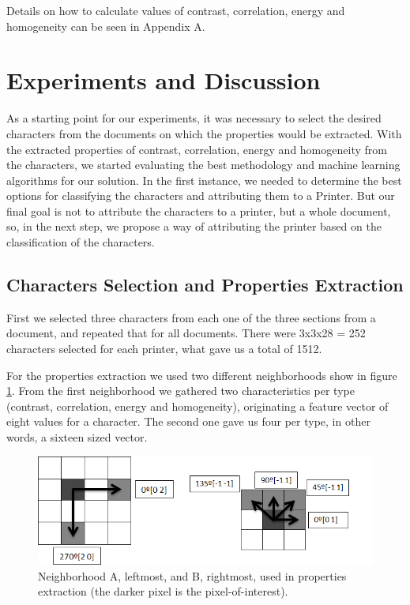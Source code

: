 \documentclass[10pt,twocolumn,letterpaper]{article}
\begin{document}
Details on how to calculate values of contrast, correlation, energy and homogeneity can be seen in Appendix A.

\section{Experiments and Discussion}
\label{sec:experiments}

As a starting point for our experiments, it was necessary to select the desired characters from the documents on which the properties would be extracted. With the extracted properties of contrast, correlation, energy and homogeneity from the characters, we started evaluating the best methodology and machine learning algorithms for our solution. In the first instance, we needed to determine the best options for classifying the characters and attributing them to a Printer. But our final goal is not to attribute the characters to a printer, but a whole document, so, in the next step, we propose a way of attributing the printer based on the classification of the characters.

\subsection{Characters Selection and Properties Extraction}

First we selected three characters from each one of the three sections from a document, and repeated that for all documents. There were 3x3x28 = 252 characters selected for each printer, what gave us a total of 1512.

For the properties extraction we used two different neighborhoods show in figure \ref{fig:neighbor}. From the first neighborhood we gathered two characteristics per type (contrast, correlation, energy and homogeneity), originating a feature vector of eight values for a character. The second one gave us four per type, in other words, a sixteen sized vector.

\begin{figure}
\begin{center}
	\includegraphics[width=0.99\columnwidth]{neighbor}
	\caption{Neighborhood A, leftmost, and B, rightmost, used in properties extraction (the darker pixel is the pixel-of-interest).}
\label{fig:neighbor}   
\end{center} 
\end{figure}
\end{document}
